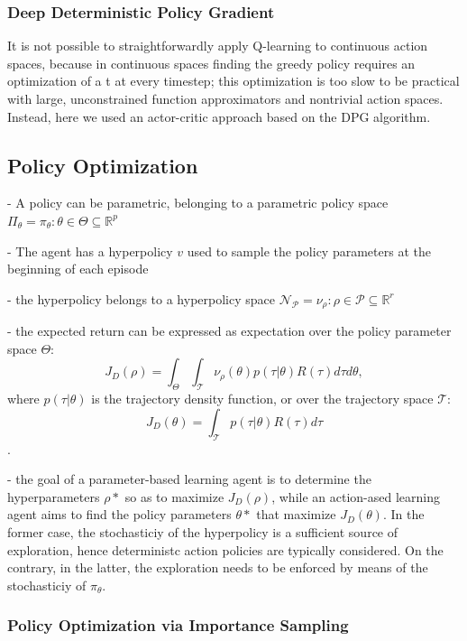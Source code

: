 \subsubsection{Deep Deterministic Policy Gradient}
\label{ddpg}
It is not possible to straightforwardly apply Q-learning to continuous action spaces, because in continuous spaces finding the greedy policy requires an optimization of a t at every timestep; this optimization is too slow to be practical with large, unconstrained function approximators and nontrivial action spaces. Instead, here we used an actor-critic approach based on the DPG algorithm.







\subsection{Policy Optimization}




- A policy can be parametric, belonging to a parametric policy space 
\(\Pi_\theta = {\pi_\theta:\theta \in \Theta \subseteq \mathbb{R}^p}\)

- The agent has a hyperpolicy $v$ used to sample the policy parameters at the beginning of each episode

- the hyperpolicy belongs to a hyperpolicy space \(\mathcal{N}_\mathcal{P} = {\nu_\rho:\rho \in \mathcal{P} \subseteq \mathbb{R}^r}\)


- the expected return can be expressed as expectation over the policy parameter space $\Theta$: \[\] \[ J_D(\rho) = \int_{\Theta} \int_{\mathcal{T}} \nu_\rho(\theta)p(\tau|\theta)R(\tau)d\tau d\theta, \] where $p(\tau|\theta)$ is the trajectory density function, or over the trajectory space $\mathcal{T}$: \[J_D(\theta) = \int_{\mathcal{T}} p(\tau|\theta)R(\tau)d\tau\].


- the goal of a parameter-based learning agent is to determine the hyperparameters \(\rho*\) so as to maximize \(J_D(\rho)\), while an action-ased learning agent aims to find the policy parameters \(\theta*\) that maximize \(J_D(\theta)\). In the former case, the stochasticiy of the hyperpolicy is a sufficient source of exploration, hence deterministc action policies are typically considered. On the contrary, in the latter, the exploration needs to be enforced by means of the stochasticiy of $\pi_\theta$.




\subsubsection{Policy Optimization via Importance Sampling}



